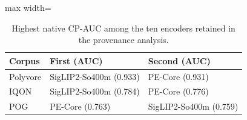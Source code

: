 \begin{table}[htbp]\centering\small
\caption{Highest native CP-AUC among the ten encoders retained in the provenance analysis.}\label{tab:prov}
\begin{adjustbox}{max width=\linewidth}\begin{tabular}{lll}\toprule
Corpus & First (AUC) & Second (AUC)\\\midrule
Polyvore & SigLIP2-So400m (0.933) & PE-Core (0.931)\\
IQON & SigLIP2-So400m (0.784) & PE-Core (0.776)\\
POG & PE-Core (0.763) & SigLIP2-So400m (0.759)\\
\bottomrule\end{tabular}\end{adjustbox}\end{table}
